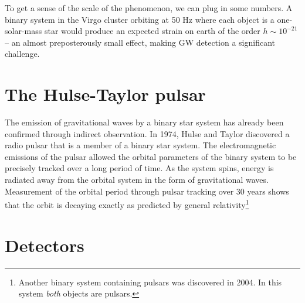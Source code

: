 To get a sense of the scale of the phenomenon, we can plug in some
numbers.  A binary system in the Virgo cluster orbiting at 50 Hz
where each object is a one-solar-mass star would produce an expected
strain on earth of the order $h\sim10^{-21}$-- an almost
preposterously small effect, making GW detection a significant
challenge.

\section{The Hulse-Taylor pulsar}

The emission of gravitational waves by a binary star system has
already been confirmed through indirect observation.  In 1974, Hulse
and Taylor discovered a radio pulsar that is a member of a binary star
system\cite{Hulse1975Discovery,Weisberg2005Relativistic}.  The
electromagnetic emissions of the pulsar allowed the orbital parameters
of the binary system to be precisely tracked over a long period of
time.  As the system spins, energy is radiated away from the orbital
system in the form of gravitational waves. Measurement of the orbital
period through pulsar tracking over 30 years shows that the orbit is
decaying exactly as predicted by general relativity\footnote{Another
  binary system containing pulsars was discovered in 2004.  In this
  system \emph{both} objects are
  pulsars\cite{Lyne2004DoublePulsar,Kramer2006Tests}.}


\section{Detectors}


